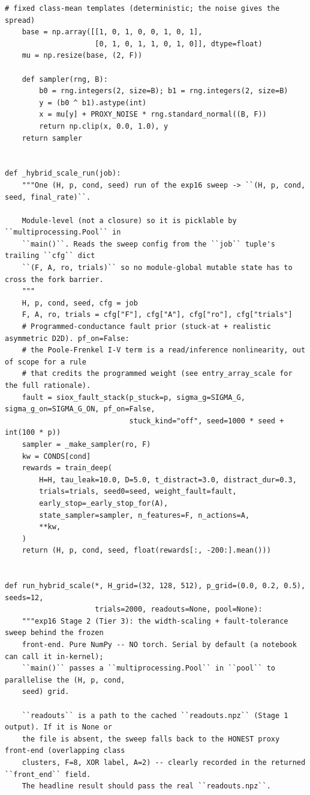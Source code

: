 \begin{lstlisting}[caption={mrl\_trace/hybrid.py},label={lst:siox-src-hybrid}]
    # fixed class-mean templates (deterministic; the noise gives the spread)
    base = np.array([[1, 0, 1, 0, 0, 1, 0, 1],
                     [0, 1, 0, 1, 1, 0, 1, 0]], dtype=float)
    mu = np.resize(base, (2, F))

    def sampler(rng, B):
        b0 = rng.integers(2, size=B); b1 = rng.integers(2, size=B)
        y = (b0 ^ b1).astype(int)
        x = mu[y] + PROXY_NOISE * rng.standard_normal((B, F))
        return np.clip(x, 0.0, 1.0), y
    return sampler


def _hybrid_scale_run(job):
    """One (H, p, cond, seed) run of the exp16 sweep -> ``(H, p, cond, seed, final_rate)``.

    Module-level (not a closure) so it is picklable by ``multiprocessing.Pool`` in
    ``main()``. Reads the sweep config from the ``job`` tuple's trailing ``cfg`` dict
    ``(F, A, ro, trials)`` so no module-global mutable state has to cross the fork barrier.
    """
    H, p, cond, seed, cfg = job
    F, A, ro, trials = cfg["F"], cfg["A"], cfg["ro"], cfg["trials"]
    # Programmed-conductance fault prior (stuck-at + realistic asymmetric D2D). pf_on=False:
    # the Poole-Frenkel I-V term is a read/inference nonlinearity, out of scope for a rule
    # that credits the programmed weight (see entry_array_scale for the full rationale).
    fault = siox_fault_stack(p_stuck=p, sigma_g=SIGMA_G, sigma_g_on=SIGMA_G_ON, pf_on=False,
                             stuck_kind="off", seed=1000 * seed + int(100 * p))
    sampler = _make_sampler(ro, F)
    kw = CONDS[cond]
    rewards = train_deep(
        H=H, tau_leak=10.0, D=5.0, t_distract=3.0, distract_dur=0.3,
        trials=trials, seed0=seed, weight_fault=fault,
        early_stop=_early_stop_for(A),
        state_sampler=sampler, n_features=F, n_actions=A,
        **kw,
    )
    return (H, p, cond, seed, float(rewards[:, -200:].mean()))


def run_hybrid_scale(*, H_grid=(32, 128, 512), p_grid=(0.0, 0.2, 0.5), seeds=12,
                     trials=2000, readouts=None, pool=None):
    """exp16 Stage 2 (Tier 3): the width-scaling + fault-tolerance sweep behind the frozen
    front-end. Pure NumPy -- NO torch. Serial by default (a notebook can call it in-kernel);
    ``main()`` passes a ``multiprocessing.Pool`` in ``pool`` to parallelise the (H, p, cond,
    seed) grid.

    ``readouts`` is a path to the cached ``readouts.npz`` (Stage 1 output). If it is None or
    the file is absent, the sweep falls back to the HONEST proxy front-end (overlapping class
    clusters, F=8, XOR label, A=2) -- clearly recorded in the returned ``front_end`` field.
    The headline result should pass the real ``readouts.npz``.


\end{lstlisting}
